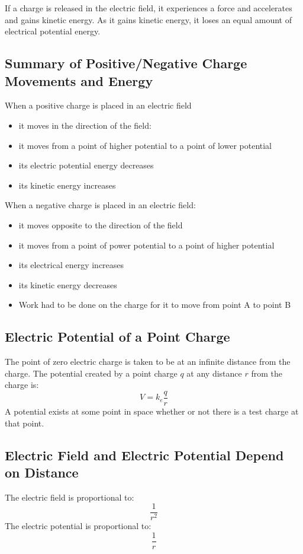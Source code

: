 If a charge is released in the electric field, it experiences a force and accelerates and gains kinetic energy. As it gains kinetic energy, it loses an equal amount of electrical potential energy.\\

\subsection{Summary of Positive/Negative Charge Movements and Energy}
When a positive charge is placed in an electric field
\begin{itemize}
	\item it moves in the direction of the field:
	\item it moves from a point of higher potential to a point of lower potential
	\item its electric potential energy decreases
	\item its kinetic energy increases\\
\end{itemize}

When a negative charge is placed in an electric field:
\begin{itemize}
	\item it moves opposite to the direction of the field
	\item it moves from a point of power potential to a point of higher potential
	\item its electrical energy increases
	\item its kinetic energy decreases
	\item Work had to be done on the charge for it to move from point A to point B
\end{itemize}

\subsection{Electric Potential of a Point Charge}
The point of zero electric charge is taken to be at an infinite distance from the charge. The potential created by a point charge $q$ at any distance $r$ from the charge is:
\[V=k_e\frac{q}{r}\]
A potential exists at some point in space whether or not there is a test charge at that point.

\subsection{Electric Field and Electric Potential Depend on Distance}
The electric field is proportional to: \[\frac{1}{r^2}\]
The electric potential is proportional to: \[\frac{1}{r}\]

